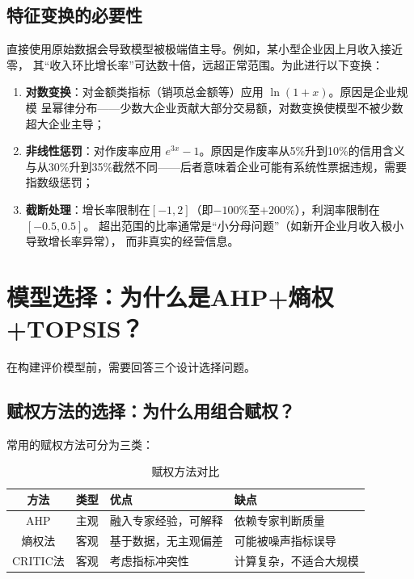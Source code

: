 \documentclass[12pt,a4paper]{ctexart}
\begin{document}
\subsection{特征变换的必要性}

直接使用原始数据会导致模型被极端值主导。例如，某小型企业因上月收入接近零，
其``收入环比增长率''可达数十倍，远超正常范围。为此进行以下变换：

\begin{enumerate}
    \item \textbf{对数变换}：对金额类指标（销项总金额等）应用 $\ln(1+x)$。原因是企业规模
          呈幂律分布——少数大企业贡献大部分交易额，对数变换使模型不被少数超大企业主导；
    \item \textbf{非线性惩罚}：对作废率应用 $e^{3x}-1$。原因是作废率从5\%升到10\%的信用含义
          与从30\%升到35\%截然不同——后者意味着企业可能有系统性票据违规，需要指数级惩罚；
    \item \textbf{截断处理}：增长率限制在$[-1,2]$（即$-100\%$至$+200\%$），利润率限制在$[-0.5,0.5]$。
          超出范围的比率通常是``小分母问题''（如新开企业月收入极小导致增长率异常），
          而非真实的经营信息。
\end{enumerate}

\section{模型选择：为什么是AHP+熵权+TOPSIS？}

在构建评价模型前，需要回答三个设计选择问题。

\subsection{赋权方法的选择：为什么用组合赋权？}

常用的赋权方法可分为三类：

\begin{table}[H]
\centering
\caption{赋权方法对比}
\label{tab:weight_comparison}
\begin{tabular}{c|l|l|l}
\toprule
\textbf{方法} & \textbf{类型} & \textbf{优点} & \textbf{缺点} \\
\midrule
AHP & 主观 & 融入专家经验，可解释 & 依赖专家判断质量 \\
熵权法 & 客观 & 基于数据，无主观偏差 & 可能被噪声指标误导 \\
CRITIC法 & 客观 & 考虑指标冲突性 & 计算复杂，不适合大规模 \\
\bottomrule
\end{tabular}
\end{table}
\end{document}
